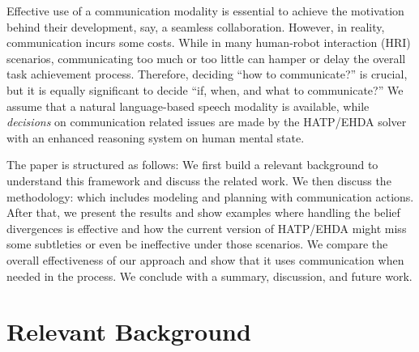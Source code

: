 \documentclass[letterpaper]{article} %
\begin{document}

Effective use of a communication modality is essential to achieve the motivation behind their development, say, a seamless collaboration. However, in reality, communication incurs some costs. 
While in many human-robot interaction (HRI) scenarios, communicating too much or too little can hamper or delay the overall task achievement process. 
Therefore, deciding ``how to communicate?'' is crucial, but it is equally significant to decide ``if, when, and what to communicate?'' 
We assume that a natural language-based speech modality is available, while 
\textit{decisions} on communication related issues are made by the HATP/EHDA solver with an enhanced reasoning system on human mental state.
%

The paper is structured as follows: We first build a relevant background to understand this framework and discuss the related work. We then discuss the methodology: which includes modeling and planning with communication actions. 
After that, we present the results and show examples where handling the belief divergences is effective and how the current version of HATP/EHDA might miss some subtleties or even be ineffective under those scenarios. We compare the overall effectiveness of our approach and show that it uses communication when needed in the process. 
We conclude with a summary, discussion, and future work.

\section{Relevant Background}
\end{document}
